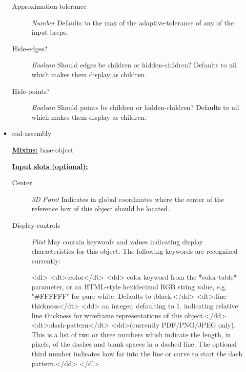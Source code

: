 \documentclass [11pt]{book}
\begin{document}
\begin{itemize}
\begin{description}
\item [Approximation-tolerance]
\emph{Number} Defaults to the max of the adaptive-tolerance of any of
the input breps.


\item [Hide-edges?]
\emph{Boolean} Should edges be children or hidden-children?
Defaults to nil which makes them display as children.


\item [Hide-points?]
\emph{Boolean} Should points be children or hidden-children?
Defaults to nil which makes them display as children.


\end{description}







\item {}cad-assembly


\textbf{
\underline{Mixins:}} base-object





\begin{description}

\end{description}








\textbf{
\underline{Input slots (optional):}}

\begin{description}

\item [Center]
\emph{3D Point} Indicates in global coordinates where the center of the reference
box of this object should be located.


\item [Display-controls]
\emph{Plist} May contain keywords and values indicating display characteristics for
this object. The following keywords are recognized currently:

<dl>
<dt>:color</dt>
<dd> color keyword from the *color-table* parameter, or an HTML-style hexidecimal
RGB string value, e.g. "\#FFFFFF" for pure white. Defaults to :black.</dd>
<dt>:line-thickness</dt>
<dd> an integer, defaulting to 1, indicating relative line thickness for wireframe
representations of this object.</dd>
<dt>:dash-pattern</dt>
<dd>(currently PDF/PNG/JPEG only). This is a list of two or three numbers which indicate the length,
in pixels, of the dashes and blank spaces in a dashed line. The optional third number
indicates how far into the line or curve to start the dash pattern.</dd>
</dl>



\end{description}
\end{itemize}
\end{document}
